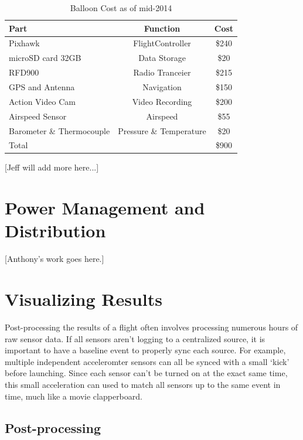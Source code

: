 \documentclass[heading.tex]{subfiles}
\begin{document}
\begin{table}[h]
    \centering
    \caption{Balloon Cost as of mid-2014}
    \label{tab:desvars}
    \begin{tabular}{l  c  c } 
        \hline \hline
        Part &  Function & Cost \\ \hline \hline
        Pixhawk & FlightController & \$240  \\ 
        microSD card 32GB & Data Storage & \$20 \\ 
        RFD900 & Radio Tranceier & \$215 \\ 
        GPS and Antenna & Navigation & \$150\\
        Action Video Cam & Video Recording & \$200\\
        Airspeed Sensor & Airspeed & \$55\\ 
        Barometer \& Thermocouple & Pressure \& Temperature & \$20 \\ \hline
        Total & & \$900 \\ \hline \hline
    \end{tabular}
\end{table}

[Jeff will add more here...]

\section{Power Management and Distribution}

[Anthony's work goes here.]

\section{Visualizing Results}

Post-processing the results of a flight often involves processing numerous
hours of raw sensor data. If all sensors aren't logging to a centralized source,
it is important to have a baseline event to properly sync each source. For
example, multiple independent acceleromter sensors can all be synced with a
small `kick' before launching. Since each sensor can't be turned on at the exact
same time, this small acceleration can used to match all sensors up to the same
event in time, much like a movie clapperboard.

\subsection{Post-processing}
\end{document}
